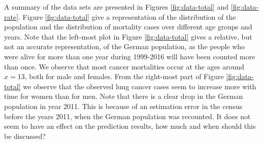 A summary of the data sets are presented in Figures \ref{fig:data-total} and \ref{fig:data-rate}. Figure \ref{fig:data-total} give a representation of the distribution of the population and the distribution of mortality cases over different age groups and years. Note that the left-most plot in Figure \ref{fig:data-total} gives a relative, but not an accurate representation, of the German population, as the people who were alive for more than one year during 1999-2016 will have been counted more than once. We observe that most cancer mortalities occur at the ages around $x = 13$, both for male and females. From the right-most part of Figure \ref{fig:data-total} we observe that the observed lung cancer cases seem to increase more with time for women than for men. \textcolor{myDarkGreen}{Note that there is a clear drop in the German population in year 2011. This is because of an estimation error in the census before the years 2011, when the German population was recounted. It does not seem to have an effect on the prediction results, how much and when should this be discussed? }

